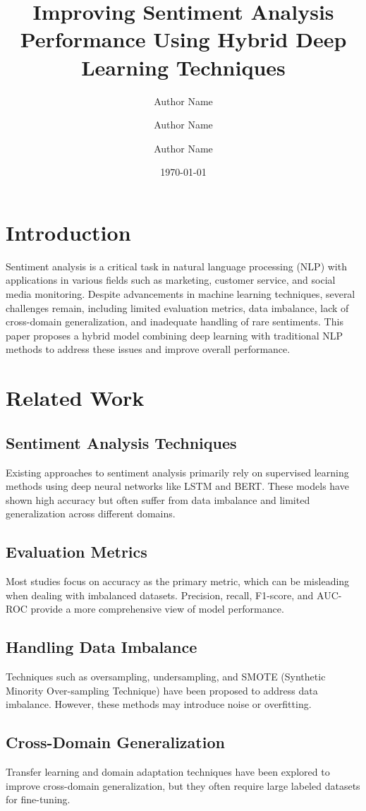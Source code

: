 \documentclass{article}
\title{Improving Sentiment Analysis Performance Using Hybrid Deep Learning Techniques}
\author{Author Name \and Author Name \and Author Name}
\date{\today}
\begin{document}
\maketitle

\section{Introduction}
Sentiment analysis is a critical task in natural language processing (NLP) with applications in various fields such as marketing, customer service, and social media monitoring. Despite advancements in machine learning techniques, several challenges remain, including limited evaluation metrics, data imbalance, lack of cross-domain generalization, and inadequate handling of rare sentiments. This paper proposes a hybrid model combining deep learning with traditional NLP methods to address these issues and improve overall performance.

\section{Related Work}
\subsection{Sentiment Analysis Techniques}
Existing approaches to sentiment analysis primarily rely on supervised learning methods using deep neural networks like LSTM and BERT. These models have shown high accuracy but often suffer from data imbalance and limited generalization across different domains.

\subsection{Evaluation Metrics}
Most studies focus on accuracy as the primary metric, which can be misleading when dealing with imbalanced datasets. Precision, recall, F1-score, and AUC-ROC provide a more comprehensive view of model performance.

\subsection{Handling Data Imbalance}
Techniques such as oversampling, undersampling, and SMOTE (Synthetic Minority Over-sampling Technique) have been proposed to address data imbalance. However, these methods may introduce noise or overfitting.

\subsection{Cross-Domain Generalization}
Transfer learning and domain adaptation techniques have been explored to improve cross-domain generalization, but they often require large labeled datasets for fine-tuning.
\end{document}

